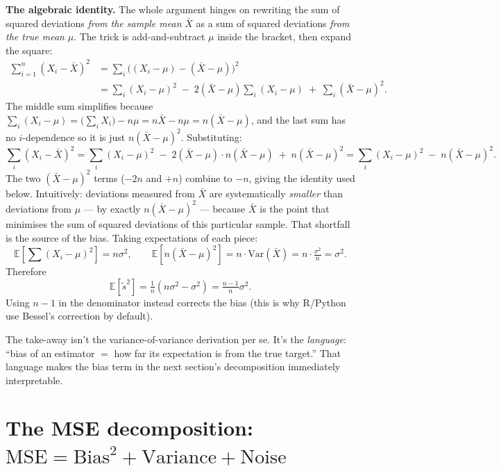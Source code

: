 \documentclass[11pt, a4paper]{article}
\begin{document}
\textbf{The algebraic identity.} The whole argument hinges on rewriting the sum of squared deviations \emph{from the sample mean} $\bar X$ as a sum of squared deviations \emph{from the true mean} $\mu$. The trick is add-and-subtract $\mu$ inside the bracket, then expand the square:
\begin{align*}
\sum_{i=1}^n (X_i - \bar X)^2
  &= \sum_i \bigl((X_i - \mu) - (\bar X - \mu)\bigr)^2 \\
  &= \sum_i (X_i - \mu)^2 \;-\; 2(\bar X - \mu)\sum_i (X_i - \mu) \;+\; \sum_i (\bar X - \mu)^2.
\end{align*}
The middle sum simplifies because $\sum_i (X_i - \mu) = \bigl(\sum_i X_i\bigr) - n\mu = n\bar X - n\mu = n(\bar X - \mu)$, and the last sum has no $i$-dependence so it is just $n(\bar X - \mu)^2$. Substituting:
\[
\sum_i (X_i - \bar X)^2
  = \sum_i (X_i - \mu)^2 \;-\; 2(\bar X - \mu)\cdot n(\bar X - \mu) \;+\; n(\bar X - \mu)^2
  = \sum_i (X_i - \mu)^2 \;-\; n(\bar X - \mu)^2.
\]
The two $(\bar X - \mu)^2$ terms ($-2n$ and $+n$) combine to $-n$, giving the identity used below. Intuitively: deviations measured from $\bar X$ are systematically \emph{smaller} than deviations from $\mu$ — by exactly $n(\bar X - \mu)^2$ — because $\bar X$ is the point that minimises the sum of squared deviations of this particular sample. That shortfall is the source of the bias. Taking expectations of each piece:
\[
\mathbb{E}\!\left[\sum (X_i - \mu)^2\right] = n\sigma^2, \qquad \mathbb{E}\!\left[n(\bar X - \mu)^2\right] = n \cdot \mathrm{Var}(\bar X) = n \cdot \tfrac{\sigma^2}{n} = \sigma^2.
\]
Therefore
\[
\mathbb{E}[\tilde s^2] = \tfrac{1}{n}(n\sigma^2 - \sigma^2) = \tfrac{n-1}{n}\sigma^2.
\]
Using $n-1$ in the denominator instead corrects the bias (this is why R/Python use Bessel's correction by default).

\begin{notebox}
The take-away isn't the variance-of-variance derivation per se. It's the \emph{language}: ``bias of an estimator $=$ how far its expectation is from the true target.'' That language makes the bias term in the next section's decomposition immediately interpretable.
\end{notebox}

\section{The MSE decomposition: $\text{MSE} = \text{Bias}^2 + \text{Variance} + \text{Noise}$}
\end{document}
